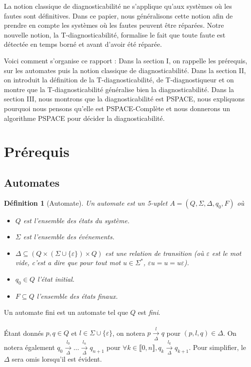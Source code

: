 \documentclass[conference]{IEEEtran}
\newtheorem{mydef}{D\'efinition}
\newcommand{\enum}[2]{\llbracket #1, #2 \rrbracket}
\begin{document}
La notion classique de diagnosticabilit\'e\cite{SamSRST96} ne s'applique qu'aux systèmes où les fautes sont définitives. Dans ce papier, nous généralisons cette notion afin de prendre en compte les systèmes où les fautes peuvent être r\'eparées. Notre nouvelle notion, la T-diagnosticabilit\'e, formalise le fait que toute faute est détectée en temps born\'e et avant d'avoir été r\'epar\'ee.

Voici comment s'organise ce rapport : Dans la section I, on rappelle les prérequis, sur les automates puis la notion classique de diagnosticabilité. Dans la section II, on introduit la définition de la T-diagnosticabilit\'e, de T-diagnostiqueur et on montre que la T-diagnosticabilit\'e généralise bien la diagnosticabilité. Dans la section III, nous montrons que la diagnosticabilité est PSPACE, nous expliquons pourquoi nous pensons qu'elle est PSPACE-Complète et nous donnerons un algorithme PSPACE pour décider la diagnosticabilité.

\section{Pr\'erequis}

\subsection{Automates}

\begin{mydef}[Automate]
Un automate est un 5-uplet $A = (Q, \Sigma, \Delta, q_0, F)$ o\`u
\begin{itemize}
	\item $Q$ est l'ensemble des états du système.
	\item $\Sigma$ est l'ensemble des événements.
	\item $\Delta \subseteq (Q \times (\Sigma \cup \{\varepsilon\}) \times Q)$ est une relation de transition (o\`u $\varepsilon$ est le mot vide, c'est a dire que pour tout mot $u\in\Sigma^*$, $\varepsilon u = u = u\varepsilon$).
	\item $q_0 \in Q$ l'état initial.
	\item $F \subseteq Q$ l'ensemble des \'etats finaux.
\end{itemize}
\end{mydef}

Un automate fini est un automate tel que $Q$ est \emph{fini}.
\paragraph{}
\'Etant donn\'es $p,q \in Q$ et $l\in \Sigma \cup \{\varepsilon\}$, on notera $p \underset{\Delta}{\overset{l}{{\to}}}q$ pour $(p,l,q) \in \Delta$. On notera \'egalement $q_0 \underset{\Delta}{\overset{l_0}{{\to}}} \dots \underset{\Delta}{\overset{l_n}{{\to}}} q_{n+1}$ pour $\forall k \in \enum{0}{n}, q_k 
\underset{\Delta}{\overset{l_k}{{\to}}} q_{k+1}$. Pour simplifier, le $\Delta$ sera omis lorsqu'il est \'evident.
\end{document}
